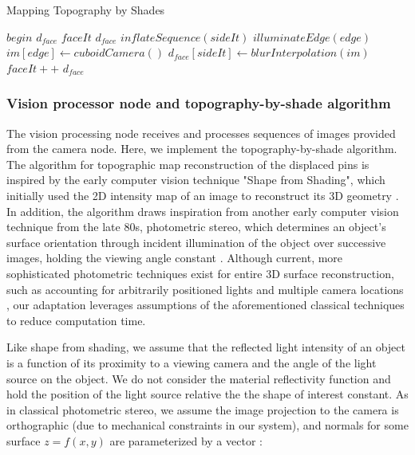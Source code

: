 \documentclass[letterpaper, 12 pt, conference]{ieeeconf}  %
\begin{document}
\makeatletter
\def\BState{\State\hskip-\ALG@thistlm}
\makeatother
\begin{algorithm}
\caption{Mapping Topography by Shades}\label{euclid}
\begin{algorithmic}[1]
	\renewcommand{\algorithmicrequire}{\textbf{Input:}}
	\renewcommand{\algorithmicensure}{\textbf{Output:}}
	\Require $begin$
	\Ensure $d_{face}$
    \State $faceIt$
    \State $d_{face}$
      \State $inflateSequence(sideIt)$
         \State $illuminateEdge(edge)$ 
         \State $im[edge] \gets cuboidCamera()$
      \EndFor
      \State $d_{face}[sideIt] \gets blurInterpolation(im)$
      \State $faceIt ++$
      \EndWhile
     \State \Return $d_{face}$
\end{algorithmic}
\end{algorithm}


\subsubsection{Vision processor node and topography-by-shade algorithm}

The vision processing node receives and processes sequences of images provided from the camera node. Here, we implement the topography-by-shade algorithm. The algorithm for topographic map reconstruction of the displaced pins is inspired by the early computer vision technique "Shape from Shading", which initially used the 2D intensity map of an image to reconstruct its 3D geometry \cite{shape_shade}. In addition, the algorithm draws inspiration from another early computer vision technique from the late 80s, photometric stereo, which determines an object's surface orientation through incident illumination of the object over successive images, holding the viewing angle constant \cite{photometric}. Although current, more sophisticated photometric techniques exist for entire 3D surface reconstruction, such as accounting for arbitrarily positioned lights and multiple camera locations \cite{jin_2008}, our adaptation leverages assumptions of the aforementioned classical techniques to reduce computation time. 
 
 Like shape from shading, we assume that the reflected light intensity of an object is a function of its proximity to a viewing camera and the angle of the light source on the object. We do not consider the material reflectivity function and hold the position of the light source relative the the shape of interest constant. As in classical photometric stereo, we assume the image projection to the camera is orthographic (due to mechanical constraints in our system), and normals for some surface $z = f(x,y)$ are parameterized by a vector \cite{photometric}: 
 
\end{document}
